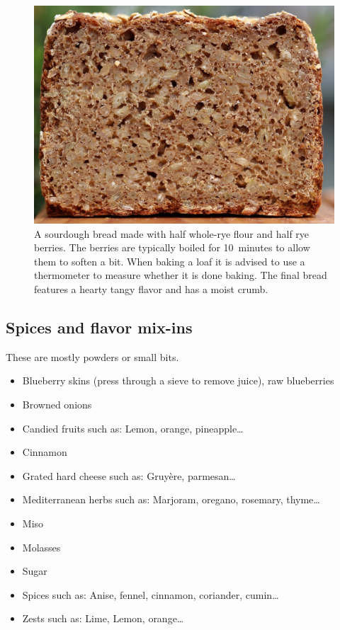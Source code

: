 \begin{figure}[htb!]
  \includegraphics[width=\textwidth]{seeds-bread}
  \caption[Whole-rye with rye berries]{A sourdough bread made with half whole-rye flour and half rye berries. The
  berries are typically boiled for 10~minutes to allow them to soften a bit. When baking a loaf
  it is advised to use a thermometer to measure whether it is done baking. The final bread
  features a hearty tangy flavor and has a moist crumb.}%
\end{figure}

\subsection{Spices and flavor mix-ins}
These are mostly powders or small bits.

\begin{itemize}
  \item Blueberry skins (press through a sieve to remove juice), raw
      blueberries
  \item Browned onions
  \item Candied fruits such as: Lemon, orange, pineapple\dots{}
  \item Cinnamon
  \item Grated hard cheese such as: Gruyère, parmesan\dots{}
  \item Mediterranean herbs such as: Marjoram, oregano, rosemary, thyme\dots{}
  \item Miso
  \item Molasses
  \item Sugar
  \item Spices such as: Anise, fennel, cinnamon, coriander, cumin\dots{}
  \item Zests such as: Lime, Lemon, orange\dots{}
\end{itemize}

